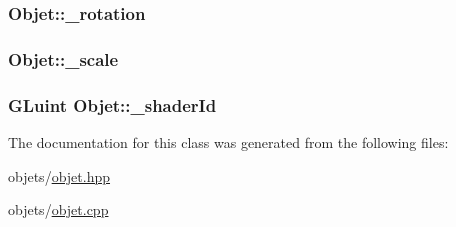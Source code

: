 \hypertarget{class_objet_a1d8675e88cc98ba740292af1421c2ee1}{
\subsubsection[{\+\_\+rotation}]{ Objet\+::\+\_\+rotation\hspace{0.3cm}{\ttfamily [protected]}}}\label{class_objet_a1d8675e88cc98ba740292af1421c2ee1}
\hypertarget{class_objet_a3fee0c5016edddf7c4b9a0b55ef44752}{
\subsubsection[{\+\_\+scale}]{ Objet\+::\+\_\+scale\hspace{0.3cm}{\ttfamily [protected]}}}\label{class_objet_a3fee0c5016edddf7c4b9a0b55ef44752}
\hypertarget{class_objet_af0d545a506dbfa377c8ca5a499fdf755}{
\subsubsection[{\+\_\+shader\+Id}]{\setlength{\rightskip}{0pt plus 5cm}G\+Luint Objet\+::\+\_\+shader\+Id\hspace{0.3cm}{\ttfamily [protected]}}}\label{class_objet_af0d545a506dbfa377c8ca5a499fdf755}


The documentation for this class was generated from the following files\+:\begin{DoxyCompactItemize}
\item 
objets/\hyperlink{objet_8hpp}{objet.\+hpp}\item 
objets/\hyperlink{objet_8cpp}{objet.\+cpp}\end{DoxyCompactItemize}
